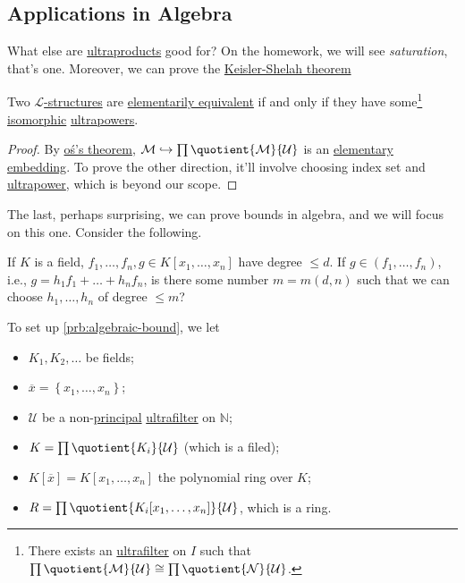 \subsection{Applications in Algebra}
What else are \hyperref[def:ultraproduct]{ultraproducts} good for? On the homework, we will see \emph{saturation}, that's one. Moreover, we can prove the \hyperref[thm:Keisler-Shelah]{Keisler-Shelah theorem}

\begin{theorem}\label{thm:Keisler-Shelah}
	Two \hyperref[def:structure]{\(\mathcal{L} \)-structures} are \hyperref[def:elementarily-equivalent]{elementarily equivalent} if and only if they have some\footnote{There exists an \hyperref[def:ultrafilter]{ultrafilter} on \(I\) such that \(\prod \quotient{\mathcal{M} }{\mathcal{U} } \cong \prod \quotient{\mathcal{N} }{\mathcal{U} } \).} \hyperref[def:isomorphism]{isomorphic} \hyperref[def:ultrapower]{ultrapowers}.
\end{theorem}
\begin{proof}
	By \hyperref[thm:Los]{oś's theorem}, \(\mathcal{M} \hookrightarrow \prod \quotient{\mathcal{M} }{\mathcal{U} } \) is an \hyperref[def:elementary-embedding]{elementary embedding}. To prove the other direction, it'll involve choosing index set and \hyperref[def:ultrapower]{ultrapower}, which is beyond our scope.
\end{proof}

The last, perhaps surprising, we can prove bounds in algebra, and we will focus on this one. Consider the following.

\begin{problem}\label{prb:algebraic-bound}
If \(K\) is a field, \(f_1, \dots , f_n, g\in K[x_1, \dots , x_n]\) have degree \(\leq d\). If \(g \in (f_1, \dots , f_n)\), i.e., \(g = h_1 f_1 + \dots + h_n f_n\), is there some number \(m = m(d, n)\) such that we can choose \(h_1, \dots , h_n\) of degree \(\leq m\)?
\end{problem}

To set up \autoref{prb:algebraic-bound}, we let
\begin{itemize}
	\item \(K_1, K_2, \dots \) be fields;
	\item \(\overline{x} = \left\{ x_1, \dots , x_n \right\} \);
	\item \(\mathcal{U} \) be a non-\hyperref[eg:principal-filter]{principal} \hyperref[def:ultrafilter]{ultrafilter} on \(\mathbb{N} \);
	\item \(K = \prod \quotient{K_i}{\mathcal{U} } \) (which is a filed);
	\item \(K[\overline{x} ] = K[x_1, \dots , x_n]\) the polynomial ring over \(K\);
	\item \(R = \prod \quotient{K_i[x_1, \dots , x_n]}{\mathcal{U} } \), which is a ring.
\end{itemize}

